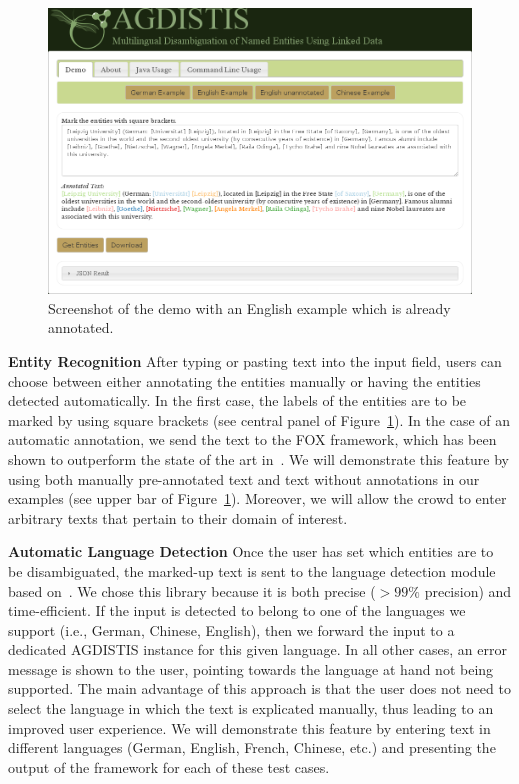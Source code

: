 \begin{figure}
\centering
\includegraphics[width=\textwidth]{part_02/unstructured_annotation/fig/GUI.png}
\caption{Screenshot of the demo with an English example which is already annotated.}
\label{fig:gui}
\end{figure}

\noindent\textbf{Entity Recognition}
After typing or pasting text into the input field, users can choose between either annotating the entities manually or having the entities detected automatically.
In the first case, the labels of the entities are to be marked by using square brackets (see central panel of Figure~\ref{fig:gui}).
In the case of an automatic annotation, we send the text to the FOX framework, which has been shown to outperform the state of the art in~\cite{FOX}.
We will demonstrate this feature by using both manually pre-annotated text and text without annotations in our examples (see upper bar of Figure~\ref{fig:gui}).
Moreover, we will allow the crowd to enter arbitrary texts that pertain to their domain of interest.

\noindent\textbf{Automatic Language Detection}
Once the user has set which entities are to be disambiguated, the marked-up text is sent to the language detection module based on~\cite{nakatani2010langdetect}.
We chose this library because it is both precise ($>99\%$ precision) and time-efficient.
If the input is detected to belong to one of the languages we support (i.e., German, Chinese, English), then we forward the input to a dedicated AGDISTIS instance for this given language.
In all other cases, an error message is shown to the user, pointing towards the language at hand not being supported.
The main advantage of this approach is that the user does not need to select the language in which the text is explicated manually, thus leading to an improved user experience. 
We will demonstrate this feature by entering text in different languages (German, English, French, Chinese, etc.) and presenting the output of the framework for each of these test cases.

